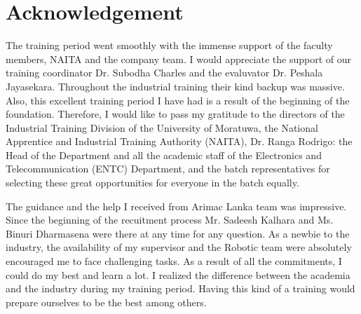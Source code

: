 \documentclass[twoside,12pt,times,onecolumn,a4paper]{report}
\begin{document}
\chapter{Acknowledgement}
\hspace{3em}The training period went smoothly with the immense support of the faculty members, NAITA and the company team. I would appreciate the support of our training coordinator Dr. Subodha Charles and the evaluvator Dr. Peshala Jayasekara. Throughout the industrial training their kind backup was massive. Also, this excellent training period I have had is a result of the beginning of the foundation. Therefore, I would like to pass my gratitude to the directors of the Industrial Training Division of the University of Moratuwa, the National Apprentice and Industrial Training Authority (NAITA), Dr. Ranga Rodrigo: the Head of the Department and all the academic staff of the Electronics and Telecommunication (ENTC) Department, and the batch representatives for selecting these great opportunities for everyone in the batch equally.

\hspace{3em}The guidance and the help I received from Arimac Lanka team was impressive. Since the beginning of the recuitment process Mr. Sadeesh Kalhara and Ms. Binuri Dharmasena were there at any time for any question. As a newbie to the industry, the availability of my supervisor and the Robotic team were absolutely encouraged me to face challenging tasks. As a result of all the commitments, I could do my best and learn a lot. I realized the difference between the academia and the industry during my training period. Having this kind of a training would prepare ourselves to be the best among others.  
\pagebreak

\tableofcontents
\end{document}
